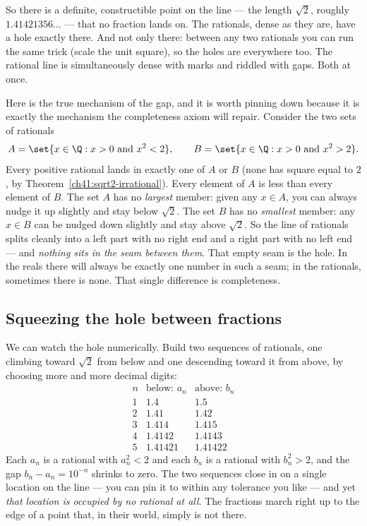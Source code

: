So there is a definite, constructible point on the line --- the length $\sqrt 2$, roughly
$1.41421356\ldots$ --- that no fraction lands on. The rationals, dense as they are, have a
hole exactly there. And not only there: between any two rationals you can run the same
trick (scale the unit square), so the holes are everywhere too. The rational line is
simultaneously dense with marks and riddled with gaps. Both at once.

\begin{happeningbox}
Here is the true mechanism of the gap, and it is worth pinning down because it is exactly
the mechanism the completeness axiom will repair. Consider the two sets of rationals
\[
  A = \set{x \in \Q : x > 0 \text{ and } x^2 < 2}, \qquad
  B = \set{x \in \Q : x > 0 \text{ and } x^2 > 2}.
\]
Every positive rational lands in exactly one of $A$ or $B$ (none has square equal to $2$,
by Theorem~\ref{ch41:sqrt2-irrational}). Every element of $A$ is less than every element
of $B$. The set $A$ has no \emph{largest} member: given any $x\in A$, you can always nudge
it up slightly and stay below $\sqrt 2$. The set $B$ has no \emph{smallest} member: any
$x\in B$ can be nudged down slightly and stay above $\sqrt 2$. So the line of rationals
splits cleanly into a left part with no right end and a right part with no left end --- and
\emph{nothing sits in the seam between them}. That empty seam is the hole. In the reals
there will always be exactly one number in such a seam; in the rationals, sometimes there
is none. That single difference is completeness.
\end{happeningbox}

\subsection*{Squeezing the hole between fractions}

We can watch the hole numerically. Build two sequences of rationals, one climbing toward
$\sqrt 2$ from below and one descending toward it from above, by choosing more and more
decimal digits:
\[
\begin{array}{c|c|c}
n & \text{below: } a_n & \text{above: } b_n \\ \hline
1 & 1.4 & 1.5 \\
2 & 1.41 & 1.42 \\
3 & 1.414 & 1.415 \\
4 & 1.4142 & 1.4143 \\
5 & 1.41421 & 1.41422
\end{array}
\]
Each $a_n$ is a rational with $a_n^2 < 2$ and each $b_n$ is a rational with $b_n^2 > 2$,
and the gap $b_n - a_n = 10^{-n}$ shrinks to zero. The two sequences close in on a single
location on the line --- you can pin it to within any tolerance you like --- and yet
\emph{that location is occupied by no rational at all}. The fractions march right up to the
edge of a point that, in their world, simply is not there.

